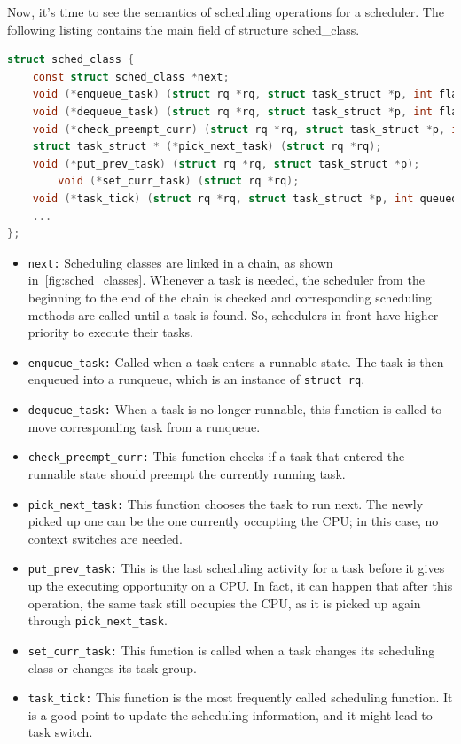 Now, it's time to see the semantics of scheduling operations for a
scheduler. The following listing contains the main field of structure
sched\_class.
\begin{lstlisting}[language=C, 
		caption={\texttt{Scheduling operations for a scheduler}},
		label={lst:sched_class}]
struct sched_class {
	const struct sched_class *next;
	void (*enqueue_task) (struct rq *rq, struct task_struct *p, int flags);
	void (*dequeue_task) (struct rq *rq, struct task_struct *p, int flags);
	void (*check_preempt_curr) (struct rq *rq, struct task_struct *p, int flags);
	struct task_struct * (*pick_next_task) (struct rq *rq);
	void (*put_prev_task) (struct rq *rq, struct task_struct *p);
        void (*set_curr_task) (struct rq *rq);
	void (*task_tick) (struct rq *rq, struct task_struct *p, int queued);
	...
};
\end{lstlisting}
\begin{itemize} 
\item \texttt{next:}
	Scheduling classes are linked in a chain, as shown 
	in~\vref{fig:sched_classes}.  Whenever a task is needed,
	the scheduler from the beginning to the end of the chain 
	is checked and corresponding scheduling methods are called
	until a task is found. So, schedulers in front have higher 
	priority to execute their tasks. 
\item \texttt{enqueue\_task:}
	Called when a task enters a runnable state. The task is then 
	enqueued into a runqueue, which is an instance of \texttt{struct rq}.
\item \texttt{dequeue\_task:}
	When a task is no longer runnable, this function is called to move
	corresponding task from a runqueue.
\item \texttt{check\_preempt\_curr:}
	This function checks if a task that entered the runnable state 
	should preempt the currently running task.
\item \texttt{pick\_next\_task:}
	This function chooses the task to run next. The newly picked up
	one can be the one currently occupting the CPU; in this case,
	no context switches are needed.
\item \texttt{put\_prev\_task:}
	This is the last scheduling activity for a task before it gives
	up the executing opportunity on a CPU. In fact, it can happen
	that after this operation, the same task still occupies the 
	CPU, as it is picked up again through \texttt{pick\_next\_task}.
\item \texttt{set\_curr\_task:}
	This function is called when a task changes its scheduling class
	or changes its task group.
\item \texttt{task\_tick:}
	This function is the most frequently called scheduling function. 
	It is a good point to update the scheduling information, and 
	it might lead to task switch.
\end{itemize} 
